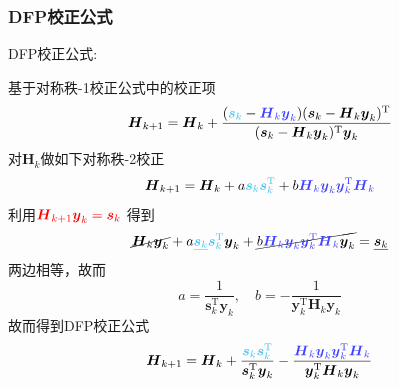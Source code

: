 \subsubsection{DFP校正公式}
\begin{note}
    DFP校正公式:

    基于对称秩-1校正公式中的校正项
    \[
        \boldsymbol{H}_{k+1} = \boldsymbol{H}_{k} + \dfrac{(\textcolor{cyan!75}{\boldsymbol{s}_{k}}-\textcolor{blue!75}{\boldsymbol{H}_{k}\boldsymbol{y}_{k}})(\boldsymbol{s}_{k}-\boldsymbol{H}_{k}\boldsymbol{y}_{k})^\mathrm{T}}{(\boldsymbol{s}_{k}-\boldsymbol{H}_{k}\boldsymbol{y}_{k})^\mathrm{T}\boldsymbol{y}_{k}}
    \]
    对$\boldsymbol{H}_{k}$做如下对称秩-2校正
    \[
        \boldsymbol{H}_{k+1} = \boldsymbol{H}_{k} + a\textcolor{cyan!75}{\boldsymbol{s}_{k}\boldsymbol{s}_{k}^{\mathrm{T}}}+b\textcolor{blue!75}{\boldsymbol{H}_{k}\boldsymbol{y}_{k}\boldsymbol{y}_{k}^{\mathrm{T}}\boldsymbol{H}_{k}}
    \]
    利用$\textcolor{red}{\boldsymbol{H}_{k+1}\boldsymbol{y}_{k} = \boldsymbol{s}_{k}}$
    得到
    \[
        \cancel{\boldsymbol{H}_{k}\boldsymbol{y}_{k}} + a\textcolor{cyan!75}{\underline{\boldsymbol{s}_{k}}\boldsymbol{s}_{k}^{\mathrm{T}}}\boldsymbol{y}_{k}+\cancel{b\textcolor{blue!75}{\boldsymbol{H}_{k}\boldsymbol{y}_{k}\boldsymbol{y}_{k}^{\mathrm{T}}\boldsymbol{H}_{k}}\boldsymbol{y}_{k} } = \underline{\boldsymbol{s}_{k}}
    \]
    两边相等，故而
    \[
        a = \dfrac{1}{\boldsymbol{s}_{k}^{\mathrm{T}}\boldsymbol{y}_{k}},\quad b = -\dfrac{1}{\boldsymbol{y}_{k}^{\mathrm{T}}\boldsymbol{H}_{k}\boldsymbol{y}_{k}} 
    \]
    故而得到DFP校正公式
    \[
        \boldsymbol{H}_{k+1} = \boldsymbol{H}_{k} + \dfrac{\textcolor{cyan!75}{\boldsymbol{s}_{k}\boldsymbol{s}_{k}^{\mathrm{T}}}}{\boldsymbol{s}_{k}^{\mathrm{T}}\boldsymbol{y}_{k}} - \dfrac{\textcolor{blue!75}{\boldsymbol{H}_{k}\boldsymbol{y}_{k}\boldsymbol{y}_{k}^{\mathrm{T}}\boldsymbol{H}_{k}}}{\boldsymbol{y}_{k}^{\mathrm{T}}\boldsymbol{H}_{k}\boldsymbol{y}_{k}}
    \]
\end{note}



